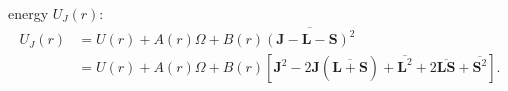 energy $U_J(r)$:
\[
\begin{split}
U_J(r)&=U(r)+A(r)\Omega+B(r)\overline{(\mathbf J-\mathbf L-\mathbf S)^2}\\
&=U(r)+A(r)\Omega+B(r)[\mathbf J^2-2\mathbf J(\overline{\mathbf L+\mathbf S})+\overline{\mathbf L^2}+2\overline{\mathbf{LS}}+\overline{\mathbf S^2}].
\end{split}
\]
